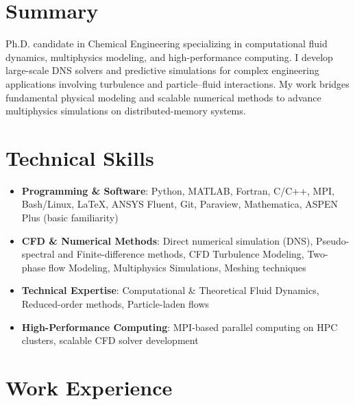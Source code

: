 \documentclass{resume}
\begin{document}
\section{\bfseries Summary}
{\justifying\noindent\small
Ph.D. candidate in Chemical Engineering specializing in computational fluid dynamics, multiphysics modeling, and high-performance computing. 
I develop large-scale DNS solvers and predictive simulations for complex engineering applications involving turbulence and particle–fluid interactions. 
My work bridges fundamental physical modeling and scalable numerical methods to advance multiphysics simulations on distributed-memory systems. 
\par



\section{\bfseries Technical Skills}
 \begin{itemize}[leftmargin=0.15in, label={$\vcenter{\hbox{\tiny$\bullet$}}$}, itemsep=0pt, parsep=1pt]
    \small
    \item \textbf{Programming \& Software}: Python, MATLAB, Fortran, C/C++, MPI, Bash/Linux, \LaTeX, ANSYS Fluent, Git, Paraview, Mathematica, ASPEN Plus (basic familiarity)  
    \item \textbf{CFD \& Numerical Methods}: Direct numerical simulation (DNS), Pseudo-spectral and Finite-difference methods, CFD Turbulence Modeling, Two-phase flow Modeling, Multiphysics Simulations, Meshing techniques 
    \item \textbf{Technical Expertise}: Computational \& Theoretical Fluid Dynamics, Reduced-order methods, Particle-laden flows 
    \item \textbf{High-Performance Computing}: MPI-based parallel computing on HPC clusters, scalable CFD solver development 
 \end{itemize}

 

\section{\bfseries Work Experience}
  \resumeSubHeadingListStart

}
\end{document}
